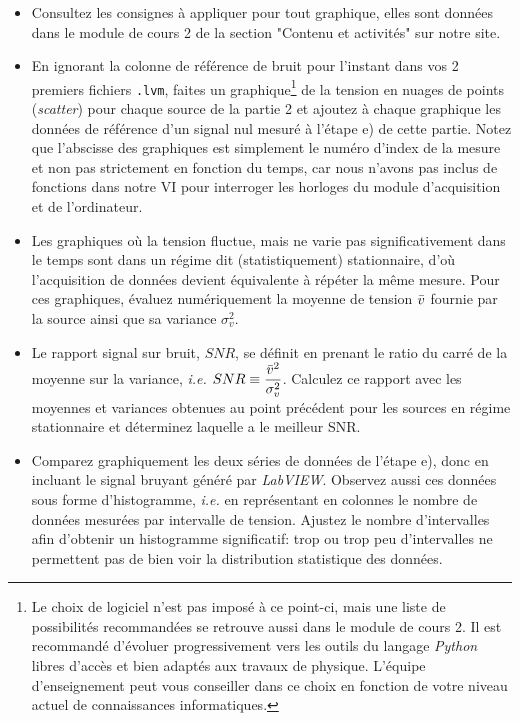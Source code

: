 \documentclass[canadien,12pt,oneside,letterpaper]{article}
\begin{document}
\begin{itemize}
    \item Consultez les consignes à appliquer pour tout graphique, elles sont données dans le module de cours 2 de la section "Contenu et activités" sur notre site.
    \item En ignorant la colonne de référence de bruit pour l'instant dans vos 2 premiers fichiers \texttt{.lvm}, faites un graphique\footnote{Le choix de logiciel n'est pas imposé à ce point-ci, mais une liste de possibilités recommandées se retrouve aussi dans le module de cours 2. Il est recommandé d'évoluer progressivement vers les outils du langage \textit{Python} libres d'accès et bien adaptés aux travaux de physique. L'équipe d'enseignement peut vous conseiller dans ce choix en fonction de votre niveau actuel de connaissances informatiques.} de la tension en nuages de points (\textit{scatter}) pour chaque source de la partie 2 et ajoutez à chaque graphique les données de référence d'un signal nul mesuré à l'étape e) de cette partie. Notez que l'abscisse des graphiques est simplement le numéro d'index de la mesure et non pas strictement en fonction du temps, car nous n'avons pas inclus de fonctions dans notre VI pour interroger les horloges du module d'acquisition et de l'ordinateur.
    \item Les graphiques où la tension fluctue, mais ne varie pas significativement dans le temps sont dans un régime dit (statistiquement) stationnaire, d'où l'acquisition de données devient équivalente à répéter la même mesure. Pour ces graphiques, évaluez numériquement la moyenne de tension $\Bar{v}$ fournie par la source ainsi que sa variance $\sigma_v^2$.
    \item Le rapport signal sur bruit, $SNR$, se définit en prenant le ratio du carré de la moyenne sur la variance, \textit{i.e.} \(\displaystyle SNR\equiv \frac{\Bar{v}^2}{\sigma_v^2}\). Calculez ce rapport avec les moyennes et variances obtenues au point précédent pour les sources en régime stationnaire et déterminez laquelle a le meilleur SNR.
    \item Comparez graphiquement les deux séries de données de l'étape e), donc en incluant le signal bruyant généré par \textit{LabVIEW}. Observez aussi ces données sous forme d'histogramme, \textit{i.e.} en représentant en colonnes le nombre de données mesurées par intervalle de tension. Ajustez le nombre d'intervalles afin d'obtenir un histogramme significatif: trop ou trop peu d'intervalles ne permettent pas de bien voir la distribution statistique des données.
\end{itemize}
\end{document}
